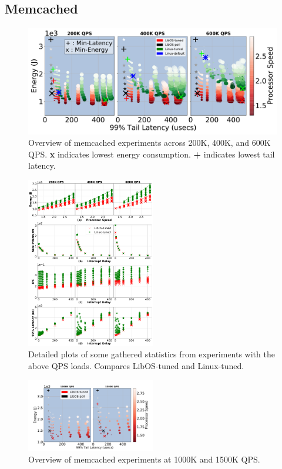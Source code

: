 \subsection{Memcached}
\label{sec:mcd}

\begin{figure}
\centering
\includegraphics[width=1\textwidth]{figures/mcd_overview}
\vspace*{-8mm}
\caption[]
{Overview of memcached experiments across 200K, 400K, and 600K QPS.
\textbf{x} indicates lowest energy consumption.
\textbf{+} indicates lowest tail latency.}
\label{fig:mcd_overview}
\end{figure}
\begin{figure}
\includegraphics[width=0.5\textwidth]{figures/mcd_detail_1}
\vspace*{-8mm}
\caption[]{Detailed plots of some gathered statistics from experiments with the above QPS loads.
Compares LibOS-tuned and Linux-tuned.}
\label{fig:mcd_detail_1}
\end{figure}
\begin{figure}
\includegraphics[width=0.5\textwidth]{figures/mcd_overview2}
\vspace*{-8mm}
\caption[]{Overview of memcached experiments at 1000K and 1500K QPS.}
\label{fig:mcd_overview2}
\end{figure}
